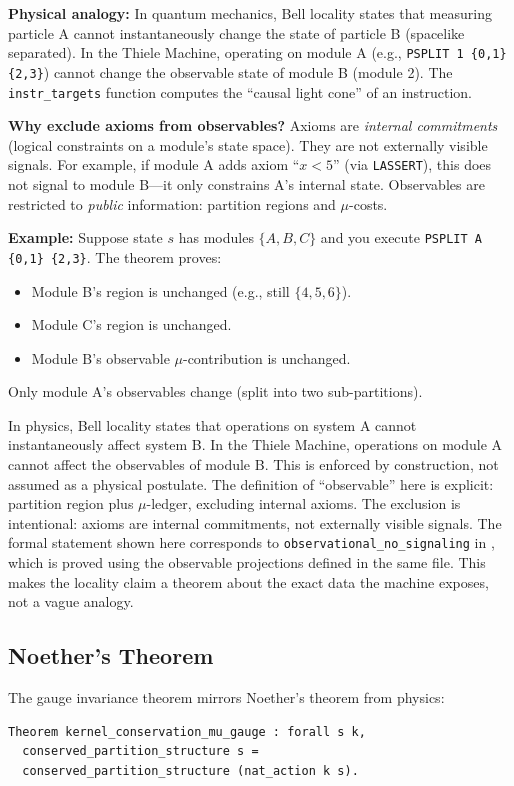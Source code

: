 \textbf{Physical analogy:} In quantum mechanics, Bell locality states that measuring particle A cannot instantaneously change the state of particle B (spacelike separated). In the Thiele Machine, operating on module A (e.g., \texttt{PSPLIT 1 \{0,1\} \{2,3\}}) cannot change the observable state of module B (module 2). The \texttt{instr\_targets} function computes the ``causal light cone'' of an instruction.

\textbf{Why exclude axioms from observables?} Axioms are \textit{internal commitments} (logical constraints on a module's state space). They are not externally visible signals. For example, if module A adds axiom ``$x < 5$'' (via \texttt{LASSERT}), this does not signal to module B---it only constrains A's internal state. Observables are restricted to \textit{public} information: partition regions and $\mu$-costs.

\textbf{Example:} Suppose state $s$ has modules $\{A, B, C\}$ and you execute \texttt{PSPLIT A \{0,1\} \{2,3\}}. The theorem proves:
\begin{itemize}
    \item Module B's region is unchanged (e.g., still $\{4,5,6\}$).
    \item Module C's region is unchanged.
    \item Module B's observable $\mu$-contribution is unchanged.
\end{itemize}
Only module A's observables change (split into two sub-partitions).


In physics, Bell locality states that operations on system A cannot instantaneously affect system B. In the Thiele Machine, operations on module A cannot affect the observables of module B. This is enforced by construction, not assumed as a physical postulate. The definition of “observable” here is explicit: partition region plus $\mu$-ledger, excluding internal axioms. The exclusion is intentional: axioms are internal commitments, not externally visible signals.
The formal statement shown here corresponds to \texttt{observational\_no\_signaling} in , which is proved using the observable projections defined in the same file. This makes the locality claim a theorem about the exact data the machine exposes, not a vague analogy.

\subsection{Noether's Theorem}

The gauge invariance theorem mirrors Noether's theorem from physics:
\begin{lstlisting}
Theorem kernel_conservation_mu_gauge : forall s k,
  conserved_partition_structure s = 
  conserved_partition_structure (nat_action k s).
\end{lstlisting}

